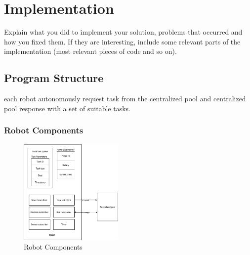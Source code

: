 \chapter{Implementation}

Explain what you did to implement your solution, problems that occurred and how you fixed them. 
If they are interesting, include some relevant parts of the implementation (most relevant pieces of code and so on). 


\section{Program Structure}


each robot autonomously request task from the centralized pool and centralized pool response with a set of suitable tasks. 
\subsection{Robot Components}


\begin{figure}[htbp]
	\centering
	\includegraphics[width = 0.45\textwidth]{content/images/ch3/system_component_robot.drawio.png}
	\caption{Robot Components}
	\label{fig:robot_components}
\end{figure}

